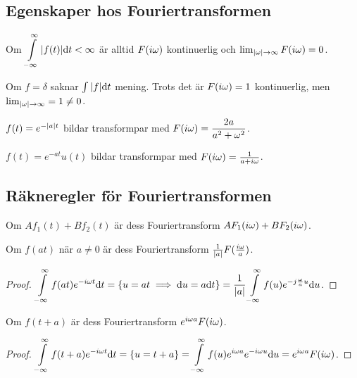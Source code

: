 \documentclass[a4paper]{article}
\begin{document}
\providecommand\fname{}
\renewcommand\fname{19-09-18}

\subsection{Egenskaper hos Fouriertransformen}

Om \(
    \displaystyle\int\limits_{-\infty}^{\infty} \abs{f(t)} \dd t < \infty
\) är alltid \(
    F(i\omega) 
\) kontinuerlig och \(
    \lim_{\abs{\omega} \to \infty} F(i\omega) = 0
\). 

\begin{ex}
    Om \(
        f = \delta
    \) saknar \(
        \int \abs{f} \dd t 
    \) mening. Trots det är \(
        F(i\omega) = 1
    \) kontinuerlig, men \(
        \lim_{\abs{\omega} \to \infty} = 1 \neq 0
    \). 
\end{ex}

\begin{ex}
    \(
        f(t) = e^{-\abs{a}t}
    \) bildar transformpar med \(
        F(i\omega) = \displaystyle\frac{2a}{a^2+\omega^2} 
    \). 

    \(
        f(t) = e^{-at}u(t)
    \) bildar transformpar med \(
        F(i\omega) = \frac{1}{a+i\omega}
    \). 
\end{ex}

\subsection{Räkneregler för Fouriertransformen}
\begin{sats}
    Om \(
        A f_1(t) + Bf_2(t)
    \) är dess Fouriertransform \(
        AF_1(i\omega) + B F_2(i\omega)
    \).
\end{sats}

\begin{sats}
    Om \(
        f(at) 
    \) när \(
        a \neq 0
    \) är dess Fouriertransform \(
        \frac{1}{\abs{a}} F(\frac{i\omega}{a})
    \).

    \begin{proof}
        \(
            \displaystyle\int\limits_{-\infty}^{\infty} f(at) e^{-i\omega t} \dd t = \{u = at \implies \dd u = a \dd t\} 
            = \frac{1}{\abs{a}} \displaystyle\int\limits_{-\infty}^{\infty} f(u) e^{-j\frac{\omega}{a}u} \dd u
        \).
    \end{proof}
\end{sats}

\begin{sats}
    Om \(
        f(t+a)
    \) är dess Fouriertransform \(
        e^{i\omega a} F(i\omega)
    \).

    \begin{proof}
        \(
            \displaystyle\int\limits_{-\infty}^{\infty} f(t+a) e^{-i\omega t} \dd t = \{u = t+a\} 
            = \displaystyle\int\limits_{-\infty}^{\infty} f(u) e^{i\omega a} e^{-i\omega u} \dd u
            = e^{i\omega a} F(i\omega)
        \).
    \end{proof}
\end{sats}
\end{document}
